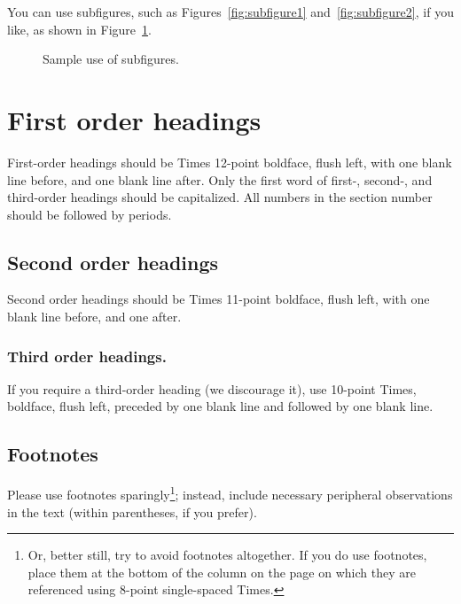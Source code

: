 \documentclass[10pt,twocolumn]{article}
\begin{document}
You can use subfigures, such as Figures~\ref{fig:subfigure1}
and~\ref{fig:subfigure2}, if you like, as shown in
Figure~\ref{fig:subfigures}.

\begin{figure}
  \caption{Sample use of subfigures.}
  \label{fig:subfigures}
\end{figure}

\section{First order headings}

First-order headings should be Times 12-point boldface, flush left,
with one blank line before, and one blank line after.  Only the first
word of first-, second-, and third-order headings should be
capitalized.  All numbers in the section number should be followed by
periods.

\subsection{Second order headings}

Second order headings should be Times 11-point boldface, flush left,
with one blank line before, and one after.

\subsubsection{Third order headings.}

If you require a third-order heading (we discourage it), use 10-point
Times, boldface, flush left, preceded by one blank line and followed by
one blank line.

\subsection{Footnotes}

Please use footnotes sparingly\footnote{Or, better still, try to avoid
  footnotes altogether.  If you do use footnotes, place them at the
  bottom of the column on the page on which they are referenced using
  8-point single-spaced Times.}; instead, include necessary peripheral
observations in the text (within parentheses, if you prefer).
\end{document}
